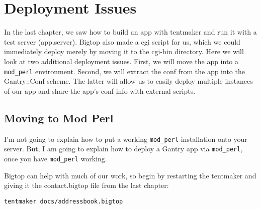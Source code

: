 \chapter{Deployment Issues}
\label{chap:deploy}

% 
% 

In the last chapter, we saw how to build an app with tentmaker and run it
with a test server (app.server).  Bigtop also made a cgi script for us, which
we could immediately deploy merely by moving it to the cgi-bin directory.
Here we will look at two additional deployment issues.  First, we will
move the app into a \verb+mod_perl+ environment.  Second, we will extract the
conf from the app into the Gantry::Conf scheme.  The latter will allow us
to easily deploy multiple instances of our app and share the app's conf info
with external scripts.

\section{Moving to Mod Perl}

I'm not going to explain how to put a working \verb+mod_perl+ installation onto
your server.  But, I am going to explain how to deploy a Gantry app via
\verb+mod_perl+, once you have \verb+mod_perl+ working.

Bigtop can help with much of our work, so begin by restarting the tentmaker
and giving it the contact.bigtop file from the last chapter:

\begin{verbatim}
tentmaker docs/addressbook.bigtop
\end{verbatim}

